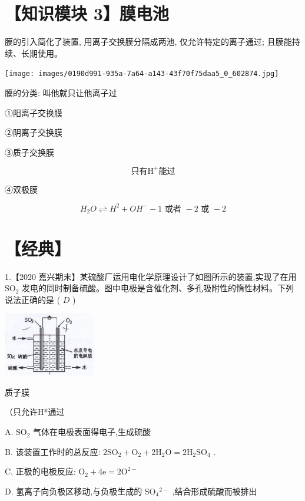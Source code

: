 \documentclass[10pt]{article}
\begin{document}
\section*{【知识模块 3】膜电池}

膜的引入简化了装置, 用离子交换膜分隔成两池, 仅允许特定的离子通过; 且膜能持续、长期使用。

\begin{center}
\texttt{[image: images/0190d991-935a-7a64-a143-43f70f75daa5\_0\_602874.jpg]}
\end{center}

膜的分类: 叫他就只让他离子过

①阳离子交换膜

②阴离子交换膜

③质子交换膜

\[
\text{只有}{\mathrm{H}}^{ + }\text{能过}
\]

④双极膜

\[
{H}_{2}O \rightleftharpoons {H}^{2} + O{H}^{ - } - 1\text{ 或者 } - 2\text{ 或 } - 2
\]

\section*{【经典】}

1.【2020 嘉兴期末】某硫酸厂运用电化学原理设计了如图所示的装置,实现了在用 \({\mathrm{{SO}}}_{2}\) 发电的同时制备硫酸。图中电极是含催化剂、多孔吸附性的惰性材料。下列说法正确的是 ( \(D\) )

\begin{center}
\includegraphics[max width=0.3\textwidth]{images/0190d991-935a-7a64-a143-43f70f75daa5_0_718268.jpg}
\end{center}

质子膜

（只允许H*通过

A. \({\mathrm{{SO}}}_{2}\) 气体在电极表面得电子,生成硫酸

B. 该装置工作时的总反应: \(2{\mathrm{{SO}}}_{2} + {\mathrm{O}}_{2} + 2{\mathrm{H}}_{2}\mathrm{O} = 2{\mathrm{H}}_{2}{\mathrm{{SO}}}_{4}\) .

C. 正极的电极反应: \({\mathrm{O}}_{2} + 4\mathrm{e} = 2{\mathrm{O}}^{2 - }\)

D. 氢离子向负极区移动,与负极生成的 \({\mathrm{{SO}}}_{4}{}^{2 - }\) ,结合形成硫酸而被排出
\end{document}
